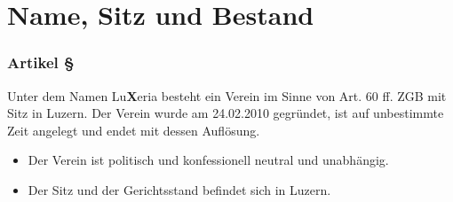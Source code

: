 \section{Name, Sitz und Bestand}

\subsubsection*{Artikel §\articlenumber}
Unter dem Namen Lu\textbf{X}eria besteht ein Verein im Sinne von Art. 60 ff.
ZGB mit Sitz in Luzern. Der Verein wurde am 24.02.2010 gegründet, ist
auf unbestimmte Zeit angelegt und endet mit dessen Auflösung.

\begin{itemize}
	\item Der Verein ist politisch und konfessionell neutral und
		unabhängig.
	\item Der Sitz und der Gerichtsstand befindet sich in Luzern.
\end{itemize}
